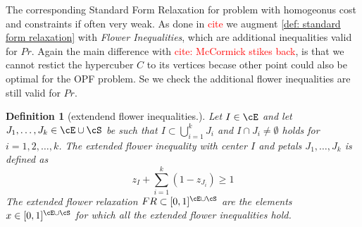 \documentclass{article}
\newtheorem{definition}{Definition}
\begin{document}
The corresponding Standard Form Relaxation for problem with homogeonus cost and constraints if often very weak. As done in \textcolor{red}{cite} we augment \ref{def: standard form relaxation} with \emph{Flower Inequalities}, which are additional inequalities valid for \(Pr\).
Again the main difference with \textcolor{red}{cite: McCormick stikes back}, is that we cannot restict the hypercuber \(C\) to its vertices becase other point could also be optimal for the OPF problem. Se we check the additional flower inequalities are still valid for \(Pr\).

\begin{definition}[extendend flower inequalities.]
  Let \(I \in \cE\) and let \(J_1,\ldots,J_k \in \cE \cup \cS\) be such that \(I \subset \bigcup_{i=1}^kJ_i\) and \(I \cap J_i \neq \emptyset\) holds for \(i = 1,2,\ldots,k\). The \emph{extended flower inequality} with center \(I\) and petals \(J_1,\ldots,J_k\) is defined as
  \begin{equation}\label{constr: extended flower inequality}
    z_I + \sum_{i=1}^k(1-z_{J_i}) \geq 1
  \end{equation}
  The extended flower relaxation \(FR \subset [0,1]^{\cE\cup\cS}\) are the elements \(x \in [0,1]^{\cE\cup\cS}\) for which all the extended flower inequalities hold.
\end{definition}
\end{document}
